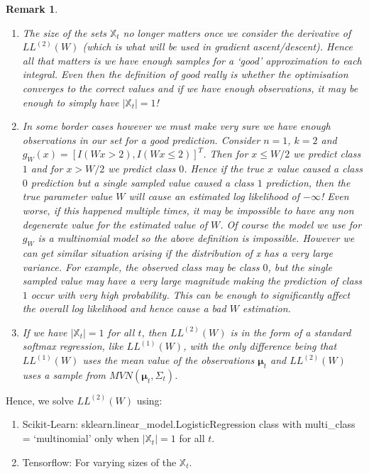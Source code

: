 \documentclass[
10pt, %
a4paper, %
oneside, %
headinclude,footinclude, %
BCOR5mm, %
]{scrartcl}
\newcommand{\bfmu}{\boldsymbol{\mu}}
\newtheorem{remark}{Remark}
\begin{document}
\begin{remark}
\begin{enumerate}
  \item The size of the sets $\mathbb{X}_t$ no longer matters once we consider
        the derivative of $LL^{(2)}(W)$ (which is what will be used in gradient
        ascent/descent). Hence all that matters is we have enough samples for a
        `good' approximation to each integral. Even then the definition of good
        really is whether the optimisation converges to the correct values and
        if we have enough observations, it may be enough to simply have $|
        \mathbb{X}_t | = 1$!
  \item In some border cases however we must make very sure we have enough
        observations in our set for a good prediction. Consider $n=1$, $k=2$
        and $g_W(x) = [I(Wx > 2), I(Wx \leq 2)]^T$. Then for $x \leq W/2$ we
        predict class $1$ and for $x > W/2$ we predict class $0$. Hence if the
        true $x$ value caused a class $0$ prediction but a single sampled value
        caused a class $1$ prediction, then the true parameter value $W$ will
        cause an estimated log likelihood of $- \infty$! Even worse, if this
        happened multiple times, it may be impossible to have any non
        degenerate value for the estimated value of $W$. Of course the model we
        use for $g_W$ is a multinomial model so the above definition is
        impossible. However we can get similar situation arising if the
        distribution of x has a very large variance. For example, the observed
        class may be class $0$, but the single sampled value may have a very
        large magnitude making the prediction of class $1$ occur with very high
        probability. This can be enough to significantly affect the overall
        log likelihood and hence cause a bad $W$ estimation.
  \item If we have $| \mathbb{X}_t | = 1 $ for all $t$, then $LL^{(2)}(W)$ is
        in the form of a standard softmax regression, like $LL^{(1)}(W)$, with
        the only difference being that $LL^{(1)}(W)$ uses the mean value of the
        observations $\bfmu_t$ and $LL^{(2)}(W)$ uses a sample from
        $MVN(\bfmu_t, \Sigma_t)$.
\end{enumerate}
\end{remark}

Hence, we solve $LL^{(2)}(W)$ using:
\begin{enumerate}
  \item Scikit-Learn: sklearn.linear\_model.LogisticRegression class with multi\_class = `multinomial' only when $| \mathbb{X}_t | = 1$ for all $t$.
  \item Tensorflow: For varying sizes of the $\mathbb{X}_t $.
\end{enumerate}
\end{document}
